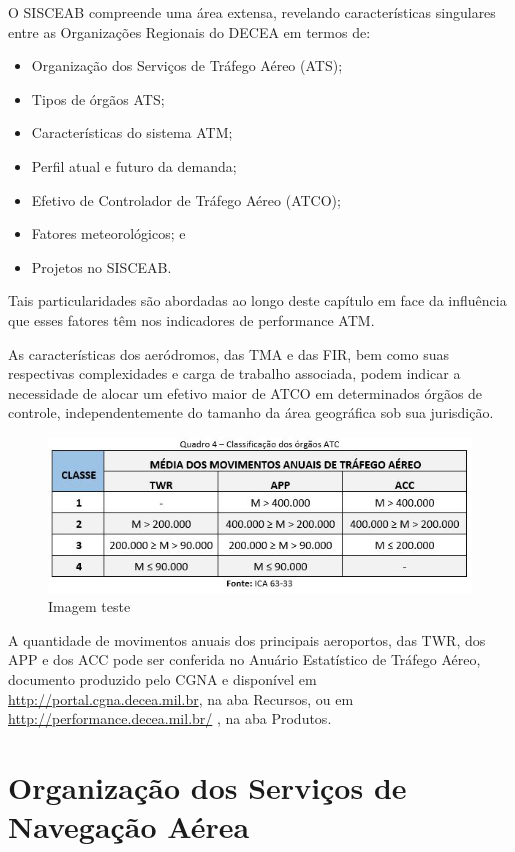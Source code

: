 \documentclass[
]{book}
\providecommand{\tightlist}{%
  \setlength{\itemsep}{0pt}\setlength{\parskip}{0pt}}
\theoremstyle{definition}
\theoremstyle{definition}
\theoremstyle{definition}
\theoremstyle{definition}
\theoremstyle{remark}
\begin{document}
O SISCEAB compreende uma área extensa, revelando características singulares entre as Organizações Regionais do DECEA em termos de:

\begin{itemize}
\tightlist
\item
  Organização dos Serviços de Tráfego Aéreo (ATS);
\item
  Tipos de órgãos ATS;
\item
  Características do sistema ATM;
\item
  Perfil atual e futuro da demanda;
\item
  Efetivo de Controlador de Tráfego Aéreo (ATCO);
\item
  Fatores meteorológicos; e
\item
  Projetos no SISCEAB.
\end{itemize}

Tais particularidades são abordadas ao longo deste capítulo em face da influência que esses fatores têm nos indicadores de performance ATM.

As características dos aeródromos, das TMA e das FIR, bem como suas respectivas complexidades e carga de trabalho associada, podem indicar a necessidade de alocar um efetivo maior de ATCO em determinados órgãos de controle, independentemente do tamanho da área geográfica sob sua jurisdição.

\begin{figure}
\centering
\includegraphics{imagens/fig10.jpg}
\caption{Imagem teste}
\end{figure}

A quantidade de movimentos anuais dos principais aeroportos, das TWR, dos APP e dos ACC pode ser conferida no Anuário Estatístico de Tráfego Aéreo, documento produzido pelo CGNA e disponível em \url{http://portal.cgna.decea.mil.br}, na aba Recursos, ou em \url{http://performance.decea.mil.br/} , na aba Produtos.

\hypertarget{organizauxe7uxe3o-dos-serviuxe7os-de-navegauxe7uxe3o-auxe9rea}{%
\section{Organização dos Serviços de Navegação Aérea}\label{organizauxe7uxe3o-dos-serviuxe7os-de-navegauxe7uxe3o-auxe9rea}}
\end{document}
